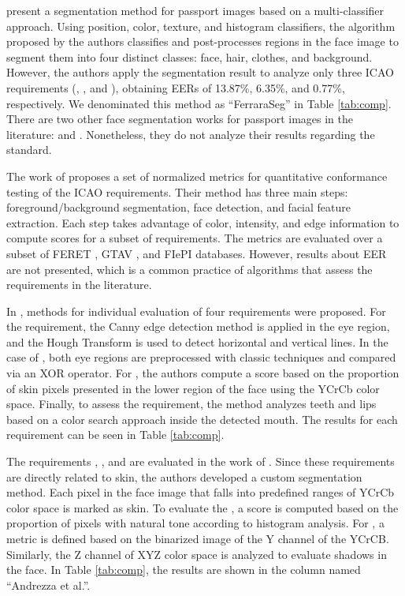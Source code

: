 \cite{ferrara2012multi} present a segmentation method for passport images based on a multi-classifier approach. Using position, color, texture, and histogram classifiers, the algorithm proposed by the authors classifies and post-processes regions in the face image to segment them into four distinct classes: face, hair, clothes, and background. However, the authors apply the segmentation result to analyze only three ICAO requirements (\hairacrosseyes, \variedbackground, and \flashskin), obtaining EERs of 13.87\%, 6.35\%, and 0.77\%, respectively. We denominated this method as ``FerraraSeg'' in Table \ref{tab:comp}. There are two other face segmentation works for passport images in the literature: \cite{hirzer2009automatic} and \cite{subasic2009expert}. Nonetheless, they do not analyze their results regarding the \icao standard.

The work of \citet{nguyen2013automated} proposes a set of normalized metrics for quantitative conformance testing of the ICAO requirements. Their method has three main steps: foreground/background segmentation, face detection, and facial feature extraction. Each step takes advantage of color, intensity, and edge information to compute scores for a subset of requirements. The metrics are evaluated over a subset of FERET \citep{phillips1998feret}, GTAV \citep{tarres2012gtav}, and FIePI databases. However, results about EER are not presented, which is a common practice of algorithms that assess the \icao requirements in the literature.

In \cite{parente2016assessing}, methods for individual evaluation of four requirements were proposed. For the \pixelation requirement, the Canny edge detection method is applied in the eye region, and the Hough Transform is used to detect horizontal and vertical lines. In the case of \hairacrosseyes, both eye regions are preprocessed with classic techniques and compared via an XOR operator. For \veiloverface, the authors compute a score based on the proportion of skin pixels presented in the lower region of the face using the YCrCb color space. Finally, to assess the \mouthopen requirement, the method analyzes teeth and lips based on a color search approach inside the detected mouth. The results for each requirement can be seen in Table \ref{tab:comp}.

The requirements \unnaturalskintone, \shadowsacrossface, and \flashskin are evaluated in the work of \citet{andrezza2016facial}. Since these requirements are directly related to skin, the authors developed a custom segmentation method. Each pixel in the face image that falls into predefined ranges of YCrCb color space is marked as skin. To evaluate the \unnaturalskintone, a score is computed based on the proportion of pixels with natural tone according to histogram analysis. For \flashskin, a metric is defined based on the binarized image of the Y channel of the YCrCB. Similarly, the Z channel of XYZ color space is analyzed to evaluate shadows in the face. In Table \ref{tab:comp}, the results are shown in the column named ``Andrezza et al.''.

